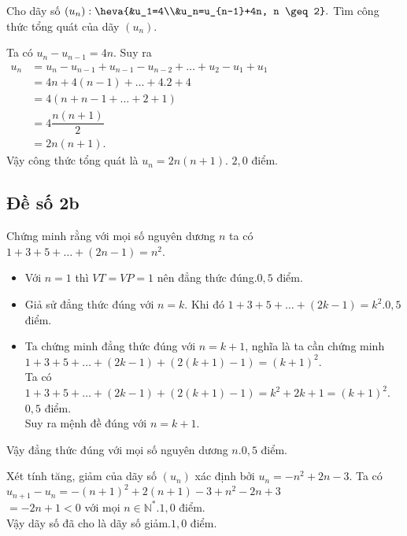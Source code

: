 \begin{bt}%
Cho dãy số $\left(u_n\right):\heva{&u_1=4\\&u_n=u_{n-1}+4n, n \geq 2}.$ Tìm công thức tổng quát của dãy $\left(u_n\right)$.
\loigiai
{
Ta có $u_n-u_{n-1}=4n$. Suy ra\\
$\begin{array}{ll}
u_n&=u_n-u_{n-1}+u_{n-1}-u_{n-2}+\dots +u_2-u_1+u_1
\\&=4n+4(n-1)+ \dots+4.2+4
\\&=4(n+n-1+\dots+2+1)
\\&=4\dfrac{n(n+1)}{2}
\\&=2n\left(n+1\right).
\end{array}$\\
Vậy công thức tổng quát là $u_n=2n\left(n+1\right)$. \dotfill $2,0$ điểm.

}
\end{bt}



\subsection{Đề số 2b}
\setcounter{bt}{0}


\begin{bt}%
Chứng minh rằng với mọi số nguyên dương $n$ ta có $1+3+5+ \dots +(2n-1)=n^2$.
\loigiai
{
\begin{itemize}
\item Với $n=1$ thì $VT=VP=1$ nên đẳng thức đúng.\dotfill $0,5$ điểm.
\item Giả sử đẳng thức đúng với $n=k$. Khi đó $1+3+5+ \dots +(2k-1)=k^2$.\dotfill $0,5$ điểm.
\item Ta chứng minh đẳng thức đúng với $n=k+1$, nghĩa là ta cần chứng minh\\
$1+3+5+ \dots +(2k-1)+(2(k+1)-1)=(k+1)^2$.\\
Ta có $1+3+5+ \dots +(2k-1)+(2(k+1)-1)=k^2+2k+1=(k+1)^2$.\dotfill $0,5$ điểm.\\
Suy ra mệnh đề đúng với $n=k+1$.
\end{itemize}
Vậy đẳng thức đúng với mọi số nguyên dương $n$.\dotfill $0,5$ điểm.\\
}
\end{bt}
\begin{bt}%
Xét tính tăng, giảm của dãy số $(u_n)$ xác định bởi $u_n=-n^2+2n-3$.
\loigiai
{
Ta có\\
$u_{n+1}-u_n=-(n+1)^2+2(n+1)-3+n^2-2n+3$\\$=-2n+1<0$ với mọi $n \in \mathbb{N^*}$.\dotfill $1,0$ điểm.\\
Vậy dãy số đã cho là dãy số giảm.\dotfill $1,0$ điểm.\\
}
\end{bt}

